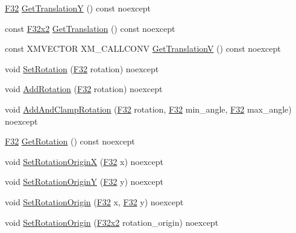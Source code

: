 \begin{DoxyCompactItemize}
\item 
\hyperlink{namespacemage_aa97e833b45f06d60a0a9c4fc22ae02c0}{F32} \hyperlink{classmage_1_1_texture_transform_a55bb63ee1f43af0208074fd876ba8d74}{Get\+TranslationY} () const noexcept
\item 
const \hyperlink{namespacemage_aa87237ad091f5cd7da612b8523fc108f}{F32x2} \hyperlink{classmage_1_1_texture_transform_ac57e70558e24264fa178f7c7c821397f}{Get\+Translation} () const noexcept
\item 
const X\+M\+V\+E\+C\+T\+OR X\+M\+\_\+\+C\+A\+L\+L\+C\+O\+NV \hyperlink{classmage_1_1_texture_transform_a17417d31cbffb2c987269c1e94ad37de}{Get\+TranslationV} () const noexcept
\item 
void \hyperlink{classmage_1_1_texture_transform_aadf399acb4be8b747e71224a3e1f723c}{Set\+Rotation} (\hyperlink{namespacemage_aa97e833b45f06d60a0a9c4fc22ae02c0}{F32} rotation) noexcept
\item 
void \hyperlink{classmage_1_1_texture_transform_a025cf31a0005883a3b351907121a5469}{Add\+Rotation} (\hyperlink{namespacemage_aa97e833b45f06d60a0a9c4fc22ae02c0}{F32} rotation) noexcept
\item 
void \hyperlink{classmage_1_1_texture_transform_ab66d7a0aeee748829636290c6222a26a}{Add\+And\+Clamp\+Rotation} (\hyperlink{namespacemage_aa97e833b45f06d60a0a9c4fc22ae02c0}{F32} rotation, \hyperlink{namespacemage_aa97e833b45f06d60a0a9c4fc22ae02c0}{F32} min\+\_\+angle, \hyperlink{namespacemage_aa97e833b45f06d60a0a9c4fc22ae02c0}{F32} max\+\_\+angle) noexcept
\item 
\hyperlink{namespacemage_aa97e833b45f06d60a0a9c4fc22ae02c0}{F32} \hyperlink{classmage_1_1_texture_transform_ade561a56fa2e80b70c74620277a9afa1}{Get\+Rotation} () const noexcept
\item 
void \hyperlink{classmage_1_1_texture_transform_a7df3d49e14ce92fc8071f15d35018eb8}{Set\+Rotation\+OriginX} (\hyperlink{namespacemage_aa97e833b45f06d60a0a9c4fc22ae02c0}{F32} x) noexcept
\item 
void \hyperlink{classmage_1_1_texture_transform_af5808699dd47eb6672391e5725a0b7ea}{Set\+Rotation\+OriginY} (\hyperlink{namespacemage_aa97e833b45f06d60a0a9c4fc22ae02c0}{F32} y) noexcept
\item 
void \hyperlink{classmage_1_1_texture_transform_a86667569140479a6b7bf6e1987f88c7c}{Set\+Rotation\+Origin} (\hyperlink{namespacemage_aa97e833b45f06d60a0a9c4fc22ae02c0}{F32} x, \hyperlink{namespacemage_aa97e833b45f06d60a0a9c4fc22ae02c0}{F32} y) noexcept
\item 
void \hyperlink{classmage_1_1_texture_transform_a925bdc5bb7405a34a79798a813e55586}{Set\+Rotation\+Origin} (\hyperlink{namespacemage_aa87237ad091f5cd7da612b8523fc108f}{F32x2} rotation\+\_\+origin) noexcept

\end{DoxyCompactItemize}
